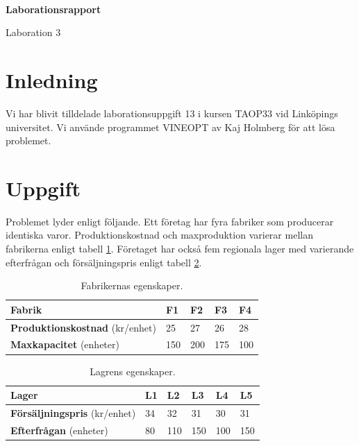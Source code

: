 \documentclass[titlepage, a4paper]{article}
\begin{document}
{\ }\vspace{3mm}

\begin{center}
  \huge \textbf{Laborationsrapport}
\end{center}
\begin{center}
\Large Laboration 3
\end{center}

\vspace{10mm}

\section{Inledning}

Vi har blivit tilldelade laborationsuppgift 13 i kursen TAOP33 vid Linköpings universitet. Vi använde programmet VINEOPT av Kaj Holmberg för att lösa problemet.

\section{Uppgift}

Problemet lyder enligt följande.
Ett företag har fyra fabriker som producerar identiska varor. Produktionskostnad och maxproduktion varierar mellan fabrikerna enligt tabell \ref{fabrik-egenskaper}. Företaget har också fem regionala lager med varierande efterfrågan och försäljningspris enligt tabell \ref{lager-egenskaper}.

\begin{table}[h!]
    \centering
    \begin{tabular}{ | l | l | l | l | l | }
        \hline
        {\textbf{Fabrik}} & {F1} & {F2} & {F3} & {F4} \\\hline
        {\textbf{Produktionskostnad} (kr/enhet)} & {25} & {27} & {26} & {28} \\\hline
        {\textbf{Maxkapacitet} (enheter)} & {150} & {200} & {175} & {100} \\\hline
    \end{tabular}
    \caption{Fabrikernas egenskaper.} \label{fabrik-egenskaper}
\end{table}

\begin{table}[h!]
    \centering
    \begin{tabular}{ | l | l | l | l | l | l | }
        \hline
        {\textbf{Lager}} & {L1} & {L2} & {L3} & {L4} & {L5} \\\hline
        {\textbf{Försäljningspris} (kr/enhet)} & {34} & {32} & {31} & {30} & {31} \\\hline
        {\textbf{Efterfrågan} (enheter)} & {80} & {110} & {150} & {100} & {150} \\\hline
    \end{tabular}
    \caption{Lagrens egenskaper.} \label{lager-egenskaper}
\end{table}
\end{document}
